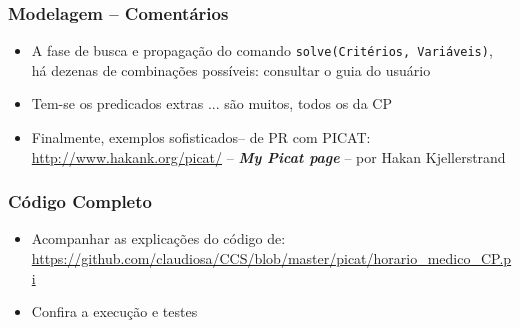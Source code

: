 \begin{frame}[fragile] 

\frametitle{Modelagem -- Comentários}

\begin{itemize}
  \item A fase de busca e propagação do comando 	\texttt{solve(Critérios, Variáveis)}, 
  há dezenas de combinações possíveis: consultar o guia do usuário
  
  \pause
  \item Tem-se os predicados extras ... são muitos, todos os da CP

  \pause
  \item Finalmente, exemplos sofisticados-- de PR com PICAT:\\
  \url{http://www.hakank.org/picat/} -- \textit{\textbf{My Picat page}} --
  por Hakan Kjellerstrand 

\end{itemize}

\end{frame}

\begin{frame}[fragile]
 \frametitle{Código Completo}

\begin{itemize}
  \item Acompanhar as explicações do código de:\\
\url{https://github.com/claudiosa/CCS/blob/master/picat/horario_medico_CP.pi}

  \item Confira a execução e testes
\end{itemize}
\end{frame}


